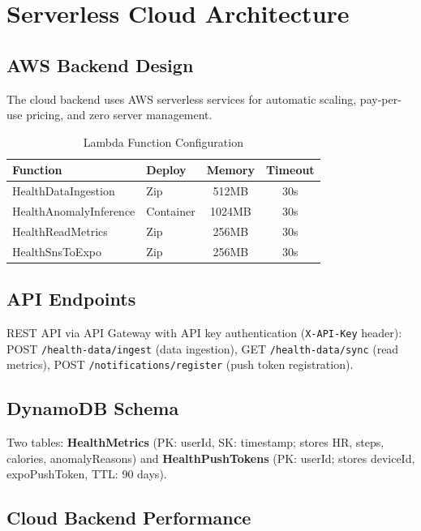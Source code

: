 \section{Serverless Cloud Architecture}

\subsection{AWS Backend Design}
The cloud backend uses AWS serverless services for automatic scaling, pay-per-use pricing, and zero server management.

\begin{table}[H]
\centering
\caption{Lambda Function Configuration}
\label{tab:lambda_config}
\begin{tabular}{llcc}
\toprule
\textbf{Function} & \textbf{Deploy} & \textbf{Memory} & \textbf{Timeout} \\
\midrule
HealthDataIngestion & Zip & 512MB & 30s \\
HealthAnomalyInference & Container & 1024MB & 30s \\
HealthReadMetrics & Zip & 256MB & 30s \\
HealthSnsToExpo & Zip & 256MB & 30s \\
\bottomrule
\end{tabular}
\end{table}

\subsection{API Endpoints}
REST API via API Gateway with API key authentication (\texttt{X-API-Key} header): POST \texttt{/health-data/ingest} (data ingestion), GET \texttt{/health-data/sync} (read metrics), POST \texttt{/notifications/register} (push token registration).

\subsection{DynamoDB Schema}
Two tables: \textbf{HealthMetrics} (PK: userId, SK: timestamp; stores HR, steps, calories, anomalyReasons) and \textbf{HealthPushTokens} (PK: userId; stores deviceId, expoPushToken, TTL: 90 days).

\subsection{Cloud Backend Performance}

